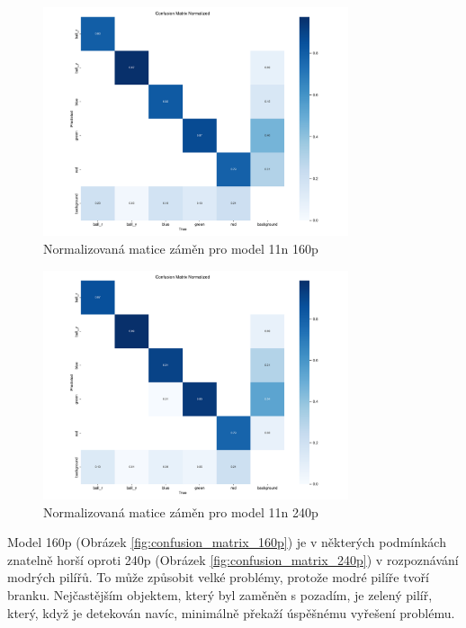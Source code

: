 \documentclass[a4paper,12pt]{article}
\begin{document}
\begin{figure}[H]
    \centering
    \includegraphics[width=0.8\textwidth]{pictures/v11n_160p.png}
    \caption{Normalizovaná matice záměn pro model 11n 160p}
    \label{fig:confusion_matrix_160p}
\end{figure}

\begin{figure}[H]
    \centering
    \includegraphics[width=0.8\textwidth]{pictures/v11n_240p.png}
    \caption{Normalizovaná matice záměn pro model 11n 240p}
    \label{fig:confusion_matrix_240p}
\end{figure}

Model 160p (Obrázek \eqref{fig:confusion_matrix_160p}) je v některých podmínkách znatelně horší oproti 240p (Obrázek \eqref{fig:confusion_matrix_240p}) v rozpoznávání modrých pilířů.
To může způsobit velké problémy, protože modré pilíře tvoří branku. Nejčastějším objektem, který byl zaměněn s pozadím, je zelený pilíř, který, když je detekován navíc, minimálně překaží úspěšnému vyřešení problému.
\end{document}
